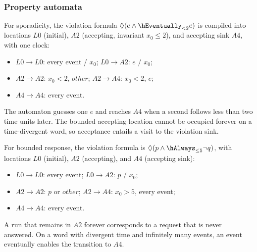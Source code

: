 \subsubsection{Property automata}
For sporadicity, the violation formula $\Diamond(e\wedge\hEventually_{<2}e)$ is compiled into locations $L0$ (initial), $A2$ (accepting, invariant $x_0\le2$), and accepting sink $A4$, with one clock:
\begin{itemize}[leftmargin=*,itemsep=0pt]
\item $L0\to L0$: every event / $x_0$; \quad $L0\to A2$: $e$ / $x_0$;
\item $A2\to A2$: $x_0<2$, $\mathit{other}$; \quad $A2\to A4$: $x_0<2$, $e$;
\item $A4\to A4$: every event.
\end{itemize}
The automaton guesses one $e$ and reaches $A4$ when a second follows less than two time units later. The bounded accepting location cannot be occupied forever on a time-divergent word, so acceptance entails a visit to the violation sink.

For bounded response, the violation formula is $\Diamond(p\wedge\hAlways_{\le5}\neg q)$, with locations $L0$ (initial), $A2$ (accepting), and $A4$ (accepting sink):
\begin{itemize}[leftmargin=*,itemsep=0pt]
\item $L0\to L0$: every event; \quad $L0\to A2$: $p$ / $x_0$;
\item $A2\to A2$: $p$ or $\mathit{other}$; \quad $A2\to A4$: $x_0>5$, every event;
\item $A4\to A4$: every event.
\end{itemize}
A run that remains in $A2$ forever corresponds to a request that is never answered. On a word with divergent time and infinitely many events, an event eventually enables the transition to $A4$.

